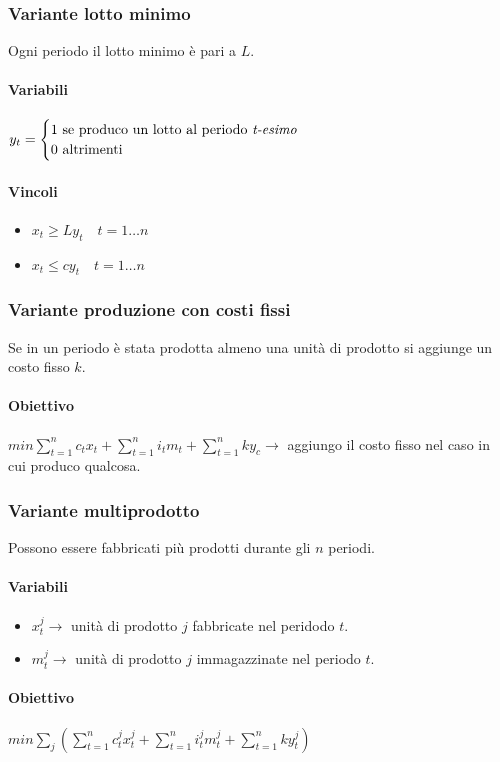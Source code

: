 \documentclass[12pt, twoside, letterpaper]{article}
\newcommand{\casi}[3]{
	$#1 = \begin{cases} \text{#2} \\ \text{#3} \end{cases}$
}
\begin{document}
			\subsubsection{Variante lotto minimo}
				Ogni periodo il lotto minimo è pari a $L$.
				\paragraph{Variabili} \casi{y_t}{1 se produco un lotto al periodo \textit{t-esimo}}{0 altrimenti}
				
				\paragraph{Vincoli} 
					\begin{itemize}
						\item $x_t \geq L y_t \quad t=1 \dots n$
						\item $x_t \leq c y_t \quad t=1 \dots n$
					\end{itemize}
					
			\subsubsection{Variante produzione con costi fissi}
				Se in un periodo è stata prodotta almeno una unità di prodotto si aggiunge un costo fisso $k$.
				\paragraph{Obiettivo}
					$min \sum_{t=1}^n c_t x_t + \sum_{t=1}^n i_t m_t + \sum_{t=1}^n k y_c \rightarrow$ aggiungo il costo fisso nel caso in cui produco qualcosa.
			
			\subsubsection{Variante multiprodotto}
				Possono essere fabbricati più prodotti durante gli $n$ periodi.
				
				\paragraph{Variabili}
					\begin{itemize}
						\item $x_t^j \rightarrow$ unità di prodotto $j$ fabbricate nel peridodo $t$.
						\item $m_t^j \rightarrow$ unità di prodotto $j$ immagazzinate nel periodo $t$.						
					\end{itemize}
					
				\paragraph{Obiettivo}
					$min \sum_j(\sum_{t=1}^n c_t^j x_t^j + \sum_{t=1}^n i_t^j m_t^j + \sum_{t=1}^n ky_t^j)$
\end{document}
